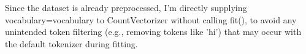 Since the dataset is already preprocessed, I'm directly supplying vocabulary=vocabulary to CountVectorizer without calling fit(), to avoid any unintended token filtering (e.g., removing tokens like 'hi') that may occur with the default tokenizer during fitting.